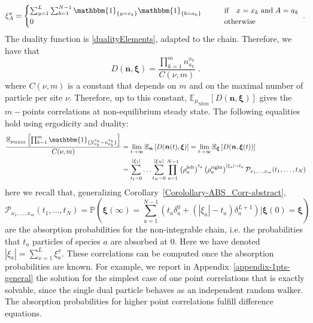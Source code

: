 \documentclass[10pt]{article}
\numberwithin{equation}{section}
\numberwithin{equation}{subsection}
\newcommand{\dt}{\;.}
\begin{document}
\begin{equation}
	\xi_{A}^{x}=	\begin{cases}
	\sum_{y=1}^{L}\sum_{b=1}^{N-1}\mathbbm{1}_{\{y=x_{k}\}}\mathbbm{1}_{\{b=a_{k}\}}\qquad &\text{if}\quad x=x_{k}\;\text{and} \; A=a_{k}\\
		 0\qquad &\text{otherwise}
	\end{cases}\dt
\end{equation}
The duality function is \eqref{dualityElements}, adapted to the chain. Therefore, we have that
\begin{equation}
	D(\bm{n},\bm{\xi})= \frac{\prod_{k=1}^{m}n_{a_{k}}^{x_{k}}}{C(\nu,m)}\dt
\end{equation}
where $C(\nu,m)$ is a constant that depends on $m$ and on the maximal number of particle per site $\nu$. 
Therefore, up to this constant, $\mathbb{E}_{\mu_{\text{NESS}}}\left[D(\bm{n},\bm{\xi})\right]$ gives the $m-$points correlations at non-equilibrium steady state. The following equalities hold using ergodicity and duality:
\begin{equation}\label{ExptationSS}
	\begin{split}
		\frac{\mathbb{E}_{\mu_{\text{NESS}}}\left[\prod_{k=1}^{m}\mathbbm{1}_{\{\mathcal{Y}_{a_{k}}^{x_{k}}=n_{a_{k}}^{x_{k}}\}}\right]}{C(\nu,m)}&=\lim_{t\to\infty}\mathbb{E}_{\bm{n}}\left[D(\bm{n}(t),\bm{\xi})\right]=\lim_{t\to\infty}\mathbb{E}_{\bm{\xi}}\left[D(\bm{n},\bm{\xi}(t))\right]
		\\&=
		\sum_{t_{1}=0}^{|\xi_{1}|}\ldots\sum_{t_{N}=0}^{|\xi_{N}|}\prod_{a=1}^{N-1}\left(\rho_{a}^{\text{left}}\right)^{t_{a}}\left(\rho_{a}^{\text{right}}\right)^{|\xi_{a}|-t_{a}}\mathcal{P}_{x_{1},\ldots,x_{m}}(t_{1},\ldots,t_{N})
	\end{split}
\end{equation}
here we recall that, generalizing Corollary~\ref{Corolollary-ABS_Corr-abstract}, %
\begin{equation}\label{Pass} 
	\mathcal{P}_{x_{1},\ldots,x_{m}}(t_{1},\ldots,t_{N})	=\mathbb{P}\left(\bm{\xi}(\infty)=\sum_{a=1}^{N-1}\left(t_{a}\delta_{a}^{0}+(|\xi_{a}|-t_{a})\delta_{a}^{L+1}\right)| \bm{\xi}(0)=\bm{\xi}\right)
\end{equation}
are the absorption probabilities for the non-integrable chain, i.e. the probabilities that $t_{a}$ particles of species $a$ are absorbed at $0$. Here we have denoted $|\xi_{a}|=\sum_{x=1}^{L}\xi_{a}^{x}$.
 These correlations can be computed once the absorption probabilities are known. For example, we report in Appendix~\ref{appendix-1pts-general} the solution for the simplest case of one point correlations that is exactly solvable, since the single dual particle behaves as an independent random walker. The absorption probabilities for higher point correlations fulfill  difference equations.
\end{document}
